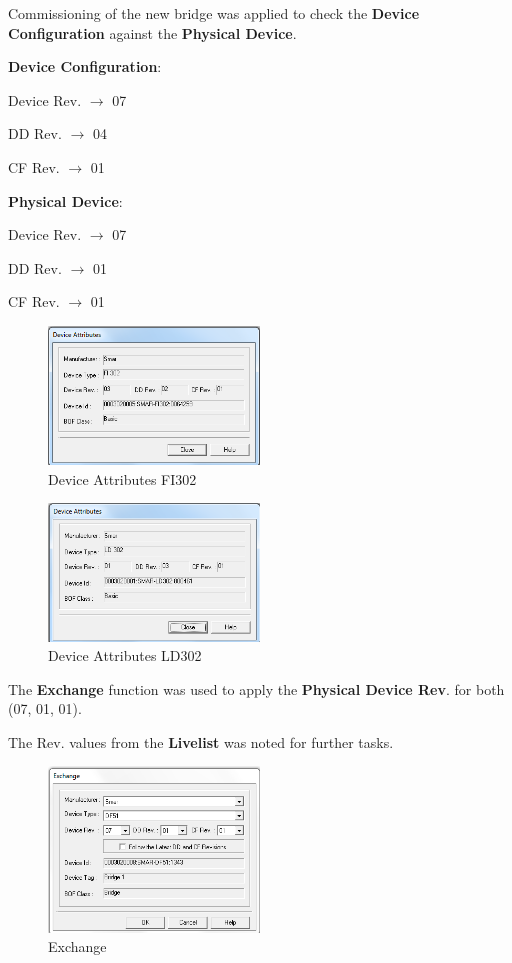 Commissioning of the new bridge was applied to check the \textbf{Device Configuration} against the \textbf{Physical Device}.

\textbf{Device Configuration}:

Device Rev. $\rightarrow$ 07

DD Rev. $\rightarrow$ 04

CF Rev. $\rightarrow$ 01

\textbf{Physical Device}:

Device Rev. $\rightarrow$ 07

DD Rev. $\rightarrow$ 01

CF Rev. $\rightarrow$ 01

\begin{figure}[!htb]
    \centering
    \centerline{\includegraphics[width=0.5\textwidth]{images/DeviceAttributesFI302}}
    \caption{Device Attributes FI302}
    \end{figure}

\begin{figure}[!htb]
    \centering
    \centerline{\includegraphics[width=0.5\textwidth]{images/DeviceAttributesLD302}}
    \caption{Device Attributes LD302}
    \end{figure}
    


The \textbf{Exchange} function was used to apply the \textbf{Physical Device Rev}. for both (07, 01, 01).

The Rev. values from the \textbf{Livelist} was noted for further tasks.

\begin{figure}[!htb]
    \centering
    \includegraphics[width=0.5\textwidth]{images/ChangeofRev}
    \caption{Exchange}
    \end{figure}

